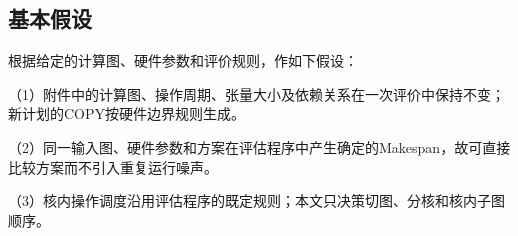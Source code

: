 \subsection{基本假设}
根据给定的计算图、硬件参数和评价规则，作如下假设：

（1）附件中的计算图、操作周期、张量大小及依赖关系在一次评价中保持不变；新计划的COPY按硬件边界规则生成。

（2）同一输入图、硬件参数和方案在评估程序中产生确定的Makespan，故可直接比较方案而不引入重复运行噪声。

（3）核内操作调度沿用评估程序的既定规则；本文只决策切图、分核和核内子图顺序。
